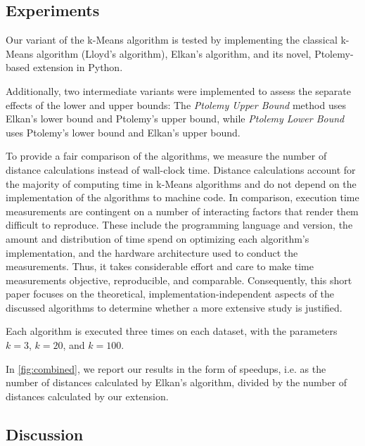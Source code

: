 \subsection{Experiments}
Our variant of the k-Means algorithm is tested by implementing the classical k-Means algorithm (Lloyd's algorithm), Elkan's algorithm, and its novel, Ptolemy-based extension in Python.

Additionally, two intermediate variants were implemented to assess the separate effects of the lower and upper bounds:
The \emph{Ptolemy Upper Bound} method uses Elkan's lower bound and Ptolemy's upper bound, while \emph{Ptolemy Lower Bound} uses Ptolemy's lower bound and Elkan's upper bound.

To provide a fair comparison of the algorithms,
we measure the number of distance calculations instead of wall-clock time.
Distance calculations account for the majority of computing time in k-Means algorithms and do not depend on the implementation of the algorithms to machine code.
In comparison, execution time measurements are contingent on a number of interacting factors that render them difficult to reproduce.
These include the programming language and version, the amount and distribution of time spend on optimizing each algorithm's implementation, and the hardware architecture used to conduct the measurements.
Thus, it takes considerable effort and care to make time measurements objective, reproducible, and comparable.
Consequently, this short paper focuses on the theoretical, implementation-independent aspects of the discussed algorithms to determine whether a more extensive study is justified.


Each algorithm is executed three times on each dataset, with the parameters $k = 3$, $k = 20$, and $k = 100$.

In \autoref{fig:combined},
we report our results in the form of speedups,
i.e. as the number of distances calculated by Elkan's algorithm,
divided by the number of distances  calculated by our extension.



\subsection{Discussion}

